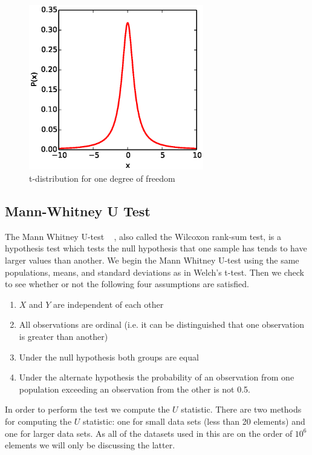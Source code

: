 \begin{figure}\label{TDist}
	  \centering
	  \includegraphics[width=3in]{figures/T_distribution_1df.eps}
	  \caption{t-distribution for one degree of freedom}
\end{figure}

\subsection{Mann-Whitney U Test}\label{sec:mannWhitney}

The Mann Whitney U-test ~\cite{wackerly_mathematical_2007} , also called the Wilcoxon rank-sum test, is a hypothesis test which tests the null hypothesis that one sample has tends to have larger values than another. We begin the Mann Whitney U-test using the same populations, means, and standard deviations as in Welch's t-test. Then we check to see whether or not the following four assumptions are satisfied. 

\begin{enumerate}
	\item $X$ and $Y$ are independent of each other
	\item All observations are ordinal (i.e. it can be distinguished that one observation is greater than another) 
	\item Under the null hypothesis both groups are equal
	\item Under the alternate hypothesis the probability of an observation from one population exceeding an observation from the other is not 0.5. 
\end{enumerate}

In order to perform the test we compute the $U$ statistic.  There are two methods for computing the $U$ statistic: one for small data sets (less than 20 elements) and one for larger data sets.  As all of the datasets used in this are on the order of $10^6$ elements we will only be discussing the latter.

